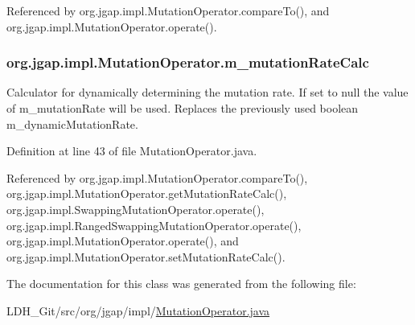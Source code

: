 Referenced by org.\-jgap.\-impl.\-Mutation\-Operator.\-compare\-To(), and org.\-jgap.\-impl.\-Mutation\-Operator.\-operate().

\hypertarget{classorg_1_1jgap_1_1impl_1_1_mutation_operator_a7159d9d04d2eec98514a4756411b1699}{
\subsubsection[{m\-\_\-mutation\-Rate\-Calc}]{ org.\-jgap.\-impl.\-Mutation\-Operator.\-m\-\_\-mutation\-Rate\-Calc\hspace{0.3cm}{\ttfamily [private]}}}\label{classorg_1_1jgap_1_1impl_1_1_mutation_operator_a7159d9d04d2eec98514a4756411b1699}
Calculator for dynamically determining the mutation rate. If set to null the value of m\-\_\-mutation\-Rate will be used. Replaces the previously used boolean m\-\_\-dynamic\-Mutation\-Rate. 

Definition at line 43 of file Mutation\-Operator.\-java.



Referenced by org.\-jgap.\-impl.\-Mutation\-Operator.\-compare\-To(), org.\-jgap.\-impl.\-Mutation\-Operator.\-get\-Mutation\-Rate\-Calc(), org.\-jgap.\-impl.\-Swapping\-Mutation\-Operator.\-operate(), org.\-jgap.\-impl.\-Ranged\-Swapping\-Mutation\-Operator.\-operate(), org.\-jgap.\-impl.\-Mutation\-Operator.\-operate(), and org.\-jgap.\-impl.\-Mutation\-Operator.\-set\-Mutation\-Rate\-Calc().



The documentation for this class was generated from the following file\-:\begin{DoxyCompactItemize}
\item 
L\-D\-H\-\_\-\-Git/src/org/jgap/impl/\hyperlink{_mutation_operator_8java}{Mutation\-Operator.\-java}\end{DoxyCompactItemize}
